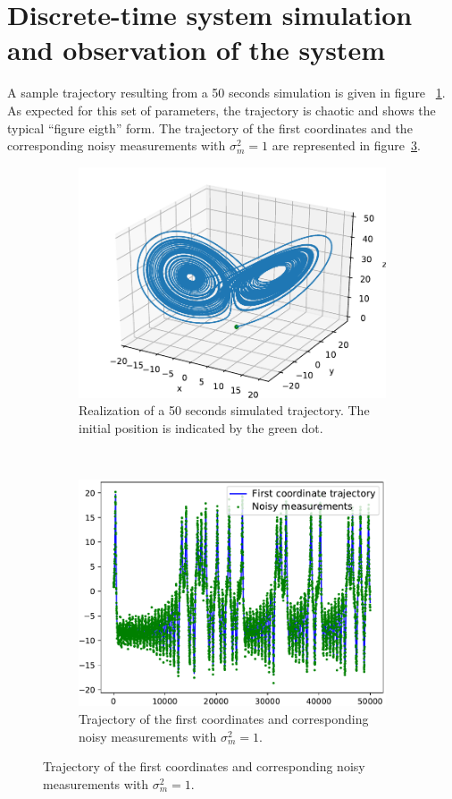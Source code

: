 \documentclass[english, DIV=13]{scrartcl}
\begin{document}
\section{Discrete-time system simulation and observation of the system}
A sample trajectory resulting from a 50 seconds simulation is given in figure~
\ref{fig:q2-3d-trajectory}. As expected for this set of parameters, the trajectory
is chaotic and shows the typical ``figure eigth'' form. 
The trajectory of the first coordinates and the corresponding noisy measurements
with $\sigma^2_m = 1$ are represented in figure~\ref{fig:q2-mes-vs-real}.
\begin{figure}[hb]
    \centering
    \begin{subfigure}{0.49\textwidth}
        \includegraphics[width=\textwidth]{figures/q2-3d-trajectory}
        \caption{Realization of a 50 seconds simulated trajectory. The initial
        position is indicated by the green dot.}
        \label{fig:q2-3d-trajectory}
    \end{subfigure}%
    ~
    \begin{subfigure}{0.49\textwidth}
        \includegraphics[width=\textwidth]{figures/q2-mes-vs-real}
        \caption{Trajectory of the first coordinates and corresponding noisy
        measurements with $\sigma^2_m = 1$.}
        \label{fig:q2-mes-vs-real}
    \end{subfigure}


\end{figure}
\end{document}
